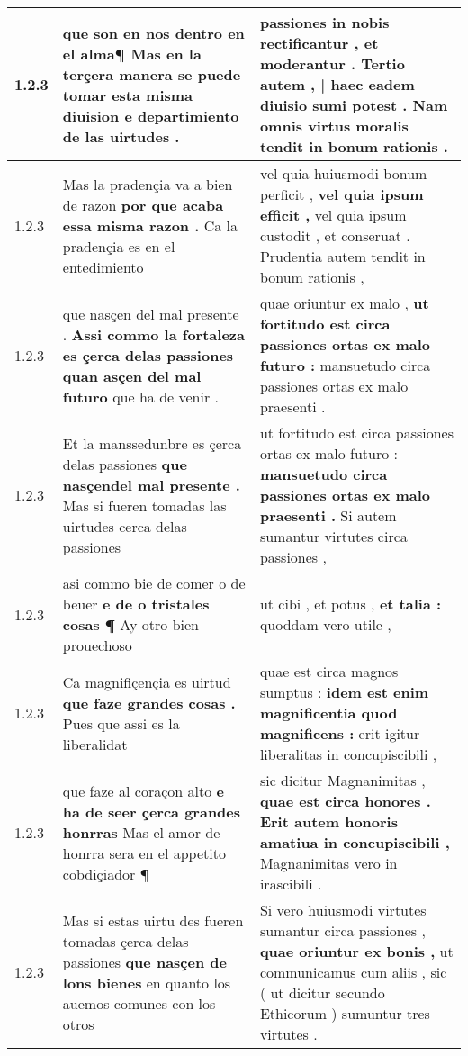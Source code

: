\begin{tabular}{|p{1cm}|p{6.5cm}|p{6.5cm}|}
1.2.3 & que son en nos dentro en el alma¶ \textbf{ Mas en la terçera manera se puede tomar esta misma diuision } e departimiento de las uirtudes . & passiones in nobis rectificantur , \textbf{ et moderantur . Tertio autem , | haec eadem diuisio sumi potest . } Nam omnis virtus moralis tendit in bonum rationis . \\\hline
1.2.3 & Mas la pradençia va a bien de razon \textbf{ por que acaba essa misma razon . } Ca la pradençia es en el entedimiento & vel quia huiusmodi bonum perficit , \textbf{ vel quia ipsum efficit , } vel quia ipsum custodit , et conseruat . Prudentia autem tendit in bonum rationis , \\\hline
1.2.3 & que nasçen del mal presente . \textbf{ Assi commo la fortaleza es çerca delas passiones quan asçen del mal futuro } que ha de venir . & quae oriuntur ex malo , \textbf{ ut fortitudo est circa passiones ortas ex malo futuro : } mansuetudo circa passiones ortas ex malo praesenti . \\\hline
1.2.3 & Et la manssedunbre es çerca delas passiones \textbf{ que nasçendel mal presente . } Mas si fueren tomadas las uirtudes cerca delas passiones & ut fortitudo est circa passiones ortas ex malo futuro : \textbf{ mansuetudo circa passiones ortas ex malo praesenti . } Si autem sumantur virtutes circa passiones , \\\hline
1.2.3 & asi commo bie de comer o de beuer \textbf{ e de o tristales cosas ¶ } Ay otro bien prouechoso & ut cibi , et potus , \textbf{ et talia : } quoddam vero utile , \\\hline
1.2.3 & Ca magnifiçençia es uirtud \textbf{ que faze grandes cosas . } Pues que assi es la liberalidat & quae est circa magnos sumptus : \textbf{ idem est enim magnificentia quod magnificens : } erit igitur liberalitas in concupiscibili , \\\hline
1.2.3 & que faze al coraçon alto \textbf{ e ha de seer çerca grandes honrras } Mas el amor de honrra sera en el appetito cobdiçiador ¶ & sic dicitur Magnanimitas , \textbf{ quae est circa honores . Erit autem honoris amatiua in concupiscibili , } Magnanimitas vero in irascibili . \\\hline
1.2.3 & Mas si estas uirtu des fueren tomadas çerca delas passiones \textbf{ que nasçen de lons bienes } en quanto los auemos comunes con los otros & Si vero huiusmodi virtutes sumantur circa passiones , \textbf{ quae oriuntur ex bonis , } ut communicamus cum aliis , sic ( ut dicitur secundo Ethicorum ) sumuntur tres virtutes . \\\hline

\end{tabular}
